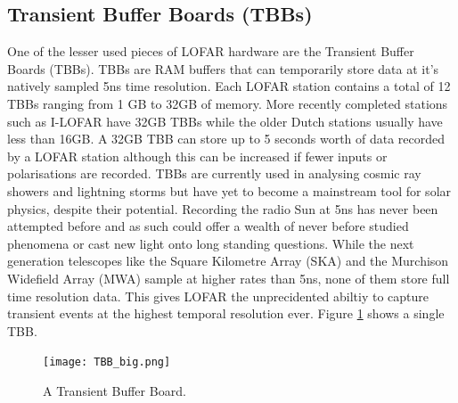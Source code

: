 \subsection{Transient Buffer Boards (TBBs)}
\label{sec:tbb}
One of the lesser used pieces of LOFAR hardware are the Transient Buffer Boards (TBBs). TBBs are RAM buffers that can temporarily store data at it's natively sampled 5ns time resolution. Each LOFAR station contains a total of 12 TBBs ranging from 1 GB to 32GB of memory. More recently completed stations such as I-LOFAR have 32GB TBBs while the older Dutch stations usually have less than 16GB.
A 32GB TBB can store up to 5 seconds worth of data recorded by a LOFAR station although this can be increased if fewer inputs or polarisations are recorded. TBBs are currently used in analysing cosmic ray showers \citep{Mulrey2020} and lightning storms \citep{Hare2018} but have yet to become a mainstream tool for solar physics, despite their potential. 
Recording the radio Sun at 5ns has never been attempted before and as such could offer a wealth of never before studied phenomena or cast new light onto long standing questions.
While the next generation telescopes like the Square Kilometre Array (SKA) and the Murchison Widefield Array (MWA) sample at higher rates than 5ns, none of them store full time resolution data. This gives LOFAR the unprecidented abiltiy to capture transient events at the highest temporal resolution ever. Figure \ref{fig:TBB} shows a single TBB.

\begin{figure}
\centering
\texttt{[image: TBB\_big.png]}
\caption[A Transient Buffer Board.]{A Transient Buffer Board.}
\label{fig:TBB}
\end{figure}

